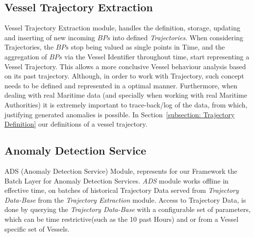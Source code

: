 
\subsection{Vessel Trajectory Extraction}
\label{subsection: 3 Vessel Trajectory Extraction}

Vessel Trajectory Extraction module, handles the definition, storage,  updating and inserting of new incoming $BPs$ into defined \emph{Trajectories}.
When considering Trajectories, the $BPs$ stop being valued as single points in Time, and the aggregation of $BPs$ via the Vessel Identifier throughout time, start representing a Vessel Trajectory. This allows a more conclusive Vessel behaviour analysis based on its past trajectory. Although, in order to work with Trajectory, such concept needs to be defined and represented in a optimal manner. Furthermore, when dealing with real Maritime data (and specially when working with real Maritime Authorities) it is extremely important to trace-back/log of the data, from which, justifying generated anomalies is possible. 
In Section~\ref{subsection: Trajectory Definition} our definitions of a vessel trajectory. 


\subsection{Anomaly Detection Service}
\label{subsection: 3 ADS}
ADS (Anomaly Detection Service) Module, represents for our Framework the Batch Layer for Anomaly Detection Services. \emph{ADS} module works offline in effective time, on batches of historical Trajectory Data served from \emph{Trajectory Data-Base} from the \emph{Trajectory Extraction} module. Access to Trajectory Data, is done by querying the \emph{Trajectory Data-Base} with a configurable set of parameters, which can be time restrictive(such as the 10 past Hours) and or from a Vessel specific set of Vessels. 

